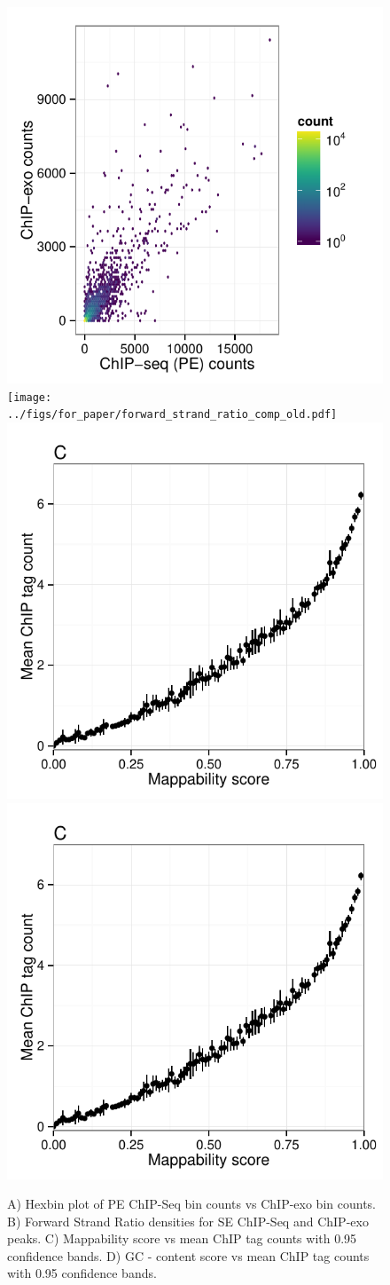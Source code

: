 \documentclass{bmcart}\usepackage[]{graphicx}\usepackage[]{color}
\begin{document}
\begin{figure}[h!]
  \centering
  \includegraphics[width = .46\textwidth,page = 3 ]{../figs/for_paper/ChIPseqPET_ChIPexo_tagCount_comparison.pdf}
  \texttt{[image: ../figs/for\_paper/forward\_strand\_ratio\_comp\_old.pdf]}
\includegraphics[width = .46\textwidth,page = 1]{../figs/for_paper/eukaryotic_bias_CTCF.pdf}
  \includegraphics[width = .46\textwidth,page = 2]{../figs/for_paper/eukaryotic_bias_CTCF.pdf}
  \caption{ A) Hexbin plot of PE ChIP-Seq bin counts vs ChIP-exo bin
    counts. B) Forward Strand Ratio densities for SE ChIP-Seq and
    ChIP-exo peaks. C) Mappability score vs mean ChIP tag counts with
    0.95 confidence bands. D) GC - content score vs mean ChIP tag
    counts with 0.95 confidence bands.}
  \label{fig:comp}
\end{figure}
\end{document}
